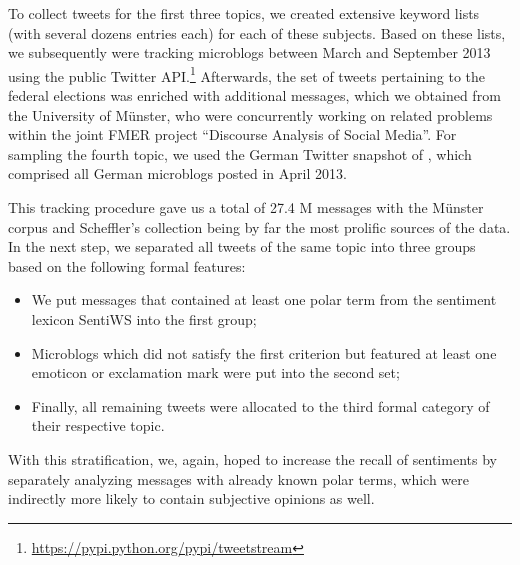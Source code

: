 To collect tweets for the first three topics, we created extensive
keyword lists (with several dozens entries each) for each of these
subjects.  Based on these lists, we subsequently were tracking
microblogs between March and September 2013 using the public Twitter
API.\footnote{\url{https://pypi.python.org/pypi/tweetstream}}
Afterwards, the set of tweets pertaining to the federal elections was
enriched with additional messages, which we obtained from the
University of M\"unster, who were concurrently working on related
problems within the joint FMER project ``Discourse Analysis of Social
Media''.  For sampling the fourth topic, we used the German Twitter
snapshot of \citet{Scheffler:14}, which comprised all German
microblogs posted in April 2013.






This tracking procedure gave us a total of 27.4 M messages with the
M\"unster corpus and Scheffler's collection being by far the most
prolific sources of the data.  In the next step, we separated all
tweets of the same topic into three groups based on the following
formal features:
\begin{itemize}
\item We put messages that contained at least one polar term from the
  sentiment lexicon SentiWS \cite{Remus:10} into the first group;
\item Microblogs which did not satisfy the first criterion but
  featured at least one emoticon or exclamation mark were put into the
  second set;
\item Finally, all remaining tweets were allocated to the third formal
  category of their respective topic.
\end{itemize}
With this stratification, we, again, hoped to increase the recall of
sentiments by separately analyzing messages with already known polar
terms, which were indirectly more likely to contain subjective
opinions as well.

